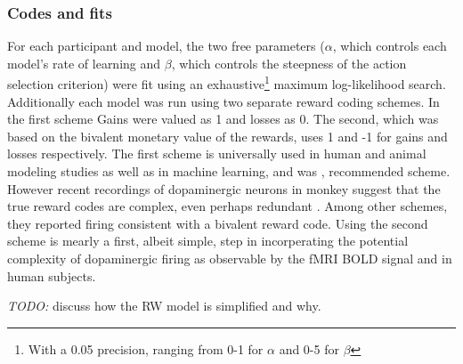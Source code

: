 \documentclass[doc,12pt]{apa}        %
\begin{document}
\subsubsection{Codes and fits}
\label{subsub:codesandfits}
For each participant and model, the two free parameters ($\alpha$, which controls each model's rate of learning and $\beta$, which controls the steepness of the action selection criterion) were fit using an exhaustive\footnote{With a 0.05 precision, ranging from 0-1 for $\alpha$ and 0-5 for $\beta$} maximum log-likelihood search.  Additionally each model was run using two separate reward coding schemes.  In the first scheme Gains were valued as 1 and losses as 0.  The second, which was based on the bivalent monetary value of the rewards, uses 1 and -1 for gains and losses respectively.  The first scheme is universally used in human and animal modeling studies as well as in machine learning, and was , recommended scheme.  However recent recordings of dopaminergic neurons in monkey suggest that the true reward codes are complex, even perhaps redundant  .  Among other schemes, they reported firing consistent with a bivalent reward code.  Using the second scheme is mearly a first, albeit simple, step in incorperating the potential complexity of dopaminergic firing as observable by the fMRI BOLD signal and in human subjects.

\emph{TODO:} discuss how the RW model is simplified and why.
\end{document}
